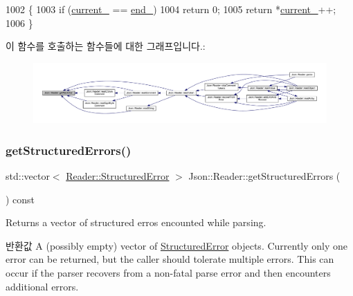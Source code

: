 \begin{DoxyCode}
1002                                \{
1003   \textcolor{keywordflow}{if} (\hyperlink{class_json_1_1_reader_a2f2feb5201a26da7aa133d2f7434479b}{current\_} == \hyperlink{class_json_1_1_reader_a714793579cbf4ee7c5a7223d2c8d77c1}{end\_})
1004     \textcolor{keywordflow}{return} 0;
1005   \textcolor{keywordflow}{return} *\hyperlink{class_json_1_1_reader_a2f2feb5201a26da7aa133d2f7434479b}{current\_}++;
1006 \}
\end{DoxyCode}
이 함수를 호출하는 함수들에 대한 그래프입니다.\+:\nopagebreak
\begin{figure}[H]
\begin{center}
\leavevmode
\includegraphics[width=350pt]{class_json_1_1_reader_ab61eb61333cc9ec3afe785663a53ce90_icgraph}
\end{center}
\end{figure}
\mbox{\label{class_json_1_1_reader_ae3d714e95bd98b27e296c607e408189b}} 
\subsubsection{\texorpdfstring{get\+Structured\+Errors()}{getStructuredErrors()}}
{\footnotesize\ttfamily std\+::vector$<$ \hyperlink{struct_json_1_1_reader_1_1_structured_error}{Reader\+::\+Structured\+Error} $>$ Json\+::\+Reader\+::get\+Structured\+Errors (\begin{DoxyParamCaption}{ }\end{DoxyParamCaption}) const}



Returns a vector of structured erros encounted while parsing. 

\begin{DoxyReturn}{반환값}
A (possibly empty) vector of \hyperlink{struct_json_1_1_reader_1_1_structured_error}{Structured\+Error} objects. Currently only one error can be returned, but the caller should tolerate multiple errors. This can occur if the parser recovers from a non-\/fatal parse error and then encounters additional errors. 
\end{DoxyReturn}


